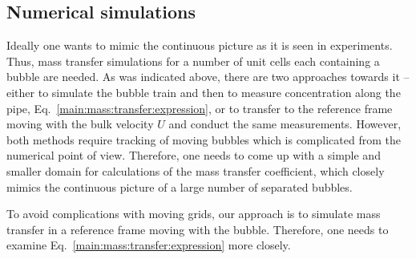 \documentclass[preprint,12pt]{elsarticle}
\begin{document}
\subsection{Numerical simulations}
\label{section:cases}
Ideally one wants to mimic the continuous picture as it is seen in experiments.
Thus, mass transfer simulations for a number of unit cells each containing a bubble are needed. As was
indicated above, there are two approaches towards it -- either to simulate the
bubble train and then to measure concentration along the pipe, Eq.~\ref{main:mass:transfer:expression},
or to transfer to the reference frame moving with the bulk
velocity $U$ and conduct the same measurements. However, both methods require tracking of
moving bubbles which is complicated from the numerical point of view. Therefore, one needs to come
up with a simple and smaller domain for calculations of the mass transfer coefficient, which closely mimics the
continuous picture of a large number of  separated bubbles. 

To avoid complications with moving grids, our
approach is to simulate mass transfer in a reference frame moving with the bubble. Therefore, one
needs to examine  Eq.~\ref{main:mass:transfer:expression} more closely. 
\end{document}

